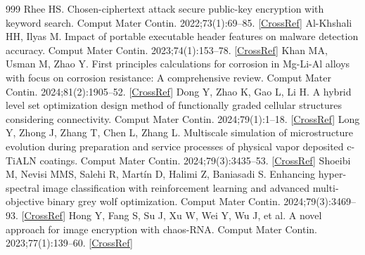 \documentclass[journal,article,submit,moreauthors,pdftex]{Definitions/tsp}
\begin{document}


%


\begin{thebibliography}{999}
Rhee HS. Chosen-ciphertext attack secure public-key encryption with keyword search. Comput Mater Contin. 2022;73(1):69--85. [\href{https://doi.org/10.32604/cmc.2022.026751}{CrossRef}]
Al-Khshali HH, Ilyas M. Impact of portable executable header features on malware detection accuracy. Comput Mater Contin. 2023;74(1):153--78. [\href{https://doi.org/10.32604/cmc.2023.032182}{CrossRef}]
Khan MA, Usman M, Zhao Y. First principles calculations for corrosion in Mg-Li-Al alloys with focus on corrosion resistance: A comprehensive review. Comput Mater Contin. 2024;81(2):1905--52. [\href{https://doi.org/10.32604/cmc.2024.054691}{CrossRef}]
Dong Y, Zhao K, Gao L, Li H. A hybrid level set optimization design method of functionally graded cellular structures considering connectivity. Comput Mater Contin. 2024;79(1):1--18. [\href{https://doi.org/10.32604/cmc.2024.048870}{CrossRef}]
Long Y, Zhong J, Zhang T, Chen L, Zhang L. Multiscale simulation of microstructure evolution during preparation and service processes of physical vapor deposited c-TiALN coatings. Comput Mater Contin. 2024;79(3):3435--53. [\href{https://doi.org/10.32604/cmc.2024.0516290}{CrossRef}]
Shoeibi M, Nevisi MMS, Salehi R, Martín D, Halimi Z, Baniasadi S. Enhancing hyper-spectral image classification with reinforcement learning and advanced multi-objective binary grey wolf optimization. Comput Mater Contin. 2024;79(3):3469--93. [\href{https://doi.org/10.32604/cmc.2024.049847}{CrossRef}]
Hong Y, Fang S, Su J, Xu W, Wei Y, Wu J, et al. A novel approach for image encryption with chaos-RNA. Comput Mater Contin. 2023;77(1):139--60. [\href{https://doi.org/10.32604/cmc.2023.043424}{CrossRef}]


\end{thebibliography}
\end{document}
